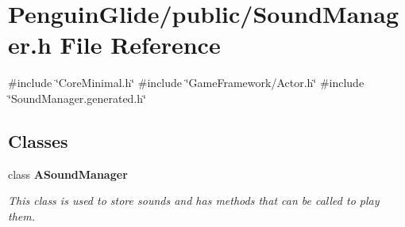 \section{Penguin\+Glide/public/\+Sound\+Manager.h File Reference}
\label{_sound_manager_8h}
{\ttfamily \#include \char`\"{}Core\+Minimal.\+h\char`\"{}}\newline
{\ttfamily \#include \char`\"{}Game\+Framework/\+Actor.\+h\char`\"{}}\newline
{\ttfamily \#include \char`\"{}Sound\+Manager.\+generated.\+h\char`\"{}}\newline
\subsection*{Classes}
\begin{DoxyCompactItemize}
\item 
class \textbf{ A\+Sound\+Manager}
\begin{DoxyCompactList}\small\item\em This class is used to store sounds and has methods that can be called to play them. \end{DoxyCompactList}\end{DoxyCompactItemize}
